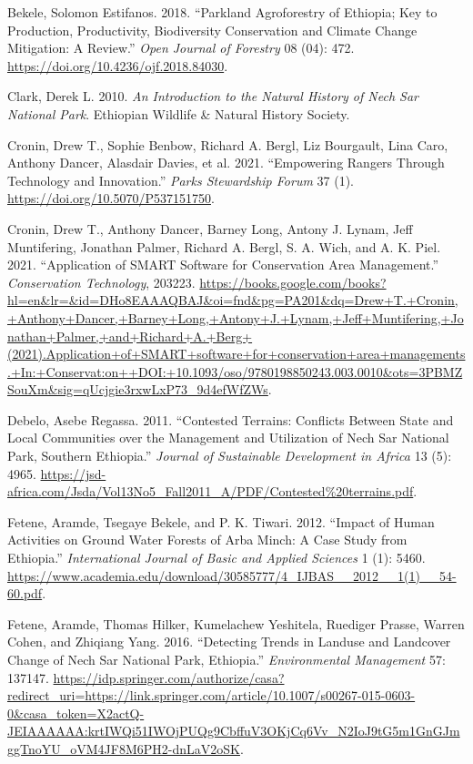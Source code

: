 \documentclass[
  letterpaper,
  DIV=11,
  numbers=noendperiod]{scrartcl}
\newlength{\cslhangindent}
\newenvironment{CSLReferences}[2] %
 {\begin{list}{}{%
  \setlength{\itemindent}{0pt}
  \setlength{\leftmargin}{0pt}
  \setlength{\parsep}{0pt}
  \ifodd #1
   \setlength{\leftmargin}{\cslhangindent}
   \setlength{\itemindent}{-1\cslhangindent}
  \fi
  \setlength{\itemsep}{#2\baselineskip}}}
 {\end{list}}
\begin{document}
\begin{CSLReferences}{1}{0}
Bekele, Solomon Estifanos. 2018. {``Parkland Agroforestry of Ethiopia;
Key to Production, Productivity, Biodiversity Conservation and Climate
Change Mitigation: A Review.''} \emph{Open Journal of Forestry} 08 (04):
472. \url{https://doi.org/10.4236/ojf.2018.84030}.

Clark, Derek L. 2010. \emph{An Introduction to the Natural History of
Nech Sar National Park}. Ethiopian Wildlife \& Natural History Society.

Cronin, Drew T., Sophie Benbow, Richard A. Bergl, Liz Bourgault, Lina
Caro, Anthony Dancer, Alasdair Davies, et al. 2021. {``Empowering
Rangers Through Technology and Innovation.''} \emph{Parks Stewardship
Forum} 37 (1). \url{https://doi.org/10.5070/P537151750}.

Cronin, Drew T., Anthony Dancer, Barney Long, Antony J. Lynam, Jeff
Muntifering, Jonathan Palmer, Richard A. Bergl, S. A. Wich, and A. K.
Piel. 2021. {``Application of SMART Software for Conservation Area
Management.''} \emph{Conservation Technology}, 203223.
\url{https://books.google.com/books?hl=en&lr=&id=DHo8EAAAQBAJ&oi=fnd&pg=PA201&dq=Drew+T.+Cronin,+Anthony+Dancer,+Barney+Long,+Antony+J.+Lynam,+Jeff+Muntifering,+Jonathan+Palmer,+and+Richard+A.+Berg+(2021).Application+of+SMART+software+for+conservation+area+managements.+In:+Conservat:on++DOI:+10.1093/oso/9780198850243.003.0010&ots=3PBMZSouXm&sig=qUcjgie3rxwLxP73_9d4efWfZWs}.

Debelo, Asebe Regassa. 2011. {``Contested Terrains: Conflicts Between
State and Local Communities over the Management and Utilization of Nech
Sar National Park, Southern Ethiopia.''} \emph{Journal of Sustainable
Development in Africa} 13 (5): 4965.
\url{https://jsd-africa.com/Jsda/Vol13No5_Fall2011_A/PDF/Contested\%20terrains.pdf}.

Fetene, Aramde, Tsegaye Bekele, and P. K. Tiwari. 2012. {``Impact of
Human Activities on Ground Water Forests of Arba Minch: A Case Study
from Ethiopia.''} \emph{International Journal of Basic and Applied
Sciences} 1 (1): 5460.
\url{https://www.academia.edu/download/30585777/4_IJBAS__2012__1(1)__54-60.pdf}.

Fetene, Aramde, Thomas Hilker, Kumelachew Yeshitela, Ruediger Prasse,
Warren Cohen, and Zhiqiang Yang. 2016. {``Detecting Trends in Landuse
and Landcover Change of Nech Sar National Park, Ethiopia.''}
\emph{Environmental Management} 57: 137147.
\url{https://idp.springer.com/authorize/casa?redirect_uri=https://link.springer.com/article/10.1007/s00267-015-0603-0&casa_token=X2actQ-JEIAAAAAA:krtIWQi51IWOjPUQg9CbffuV3OKjCq6Vv_N2IoJ9tG5m1GnGJmggTnoYU_oVM4JF8M6PH2-dnLaV2oSK}.


\end{CSLReferences}
\end{document}
